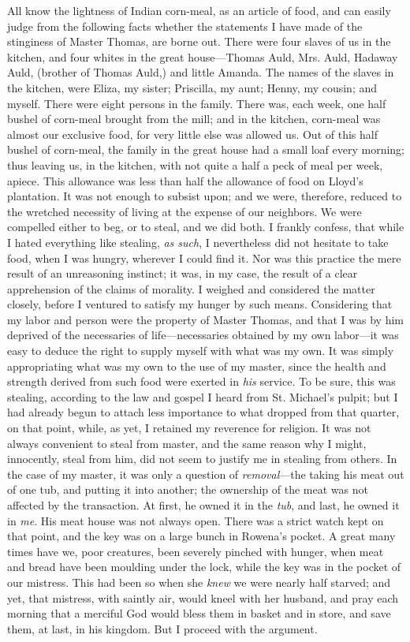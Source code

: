 All know the lightness of Indian corn-meal, as an article of food, and
can easily judge from the following facts whether the statements I have
made of the stinginess of Master Thomas, are borne out. There were four
slaves of us in the kitchen, and four whites in the great house---Thomas
Auld, Mrs. Auld, Hadaway Auld, (brother of Thomas Auld,) and little
Amanda. The names of the slaves in the kitchen, were Eliza, my sister;
Priscilla, my aunt; Henny, my cousin; and myself. There were eight
persons in the family. There was, each week, one half bushel of
corn-meal brought from the mill; and in the kitchen, corn-meal was
almost our exclusive food, for very little else was allowed us. Out of
this half bushel of corn-meal, the family in the great house had a small
loaf every morning; thus leaving us, in the kitchen, with not quite a
half a peck of meal per week, apiece. This allowance was less than half
the allowance of food on Lloyd's plantation. It was not enough to
subsist upon; and we were, therefore, reduced to the wretched necessity
of living at the expense of our neighbors. We were compelled either to
beg, or to steal, and we did both. I frankly confess, that while
{\protect\hypertarget{189}{}{}}I hated everything like stealing,
\emph{as such}, I nevertheless did not hesitate to take food, when I was
hungry, wherever I could find it. Nor was this practice the mere result
of an unreasoning instinct; it was, in my case, the result of a clear
apprehension of the claims of morality. I weighed and considered the
matter closely, before I ventured to satisfy my hunger by such means.
Considering that my labor and person were the property of Master Thomas,
and that I was by him deprived of the necessaries of life---necessaries
obtained by my own labor---it was easy to deduce the right to supply
myself with what was my own. It was simply appropriating what was my own
to the use of my master, since the health and strength derived from such
food were exerted in \emph{his} service. To be sure, this was stealing,
according to the law and gospel I heard from St. Michael's pulpit; but I
had already begun to attach less importance to what dropped from that
quarter, on that point, while, as yet, I retained my reverence for
religion. It was not always convenient to steal from master, and the
same reason why I might, innocently, steal from him, did not seem to
justify me in stealing from others. In the case of my master, it was
only a question of \emph{removal}---the taking his meat out of one tub,
and putting it into another; the ownership of the meat was not affected
by the transaction. At first, he owned it in the \emph{tub}, and last,
he owned it in \emph{me}. His meat house was not always open. There was
a strict watch kept on that point, and the key was on a large bunch in
Rowena's pocket. A great many times have we, poor creatures, been
severely pinched with hunger, {\protect\hypertarget{190}{}{}}when meat
and bread have been moulding under the lock, while the key was in the
pocket of our mistress. This had been so when she \emph{knew} we were
nearly half starved; and yet, that mistress, with saintly air, would
kneel with her husband, and pray each morning that a merciful God would
bless them in basket and in store, and save them, at last, in his
kingdom. But I proceed with the argument.

